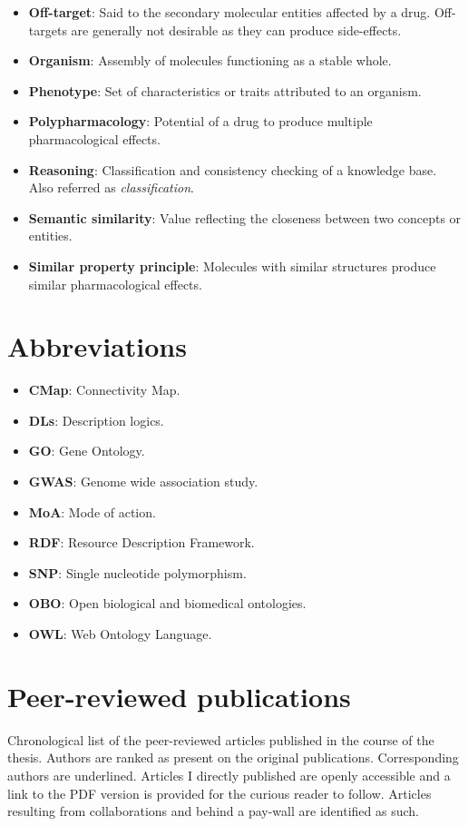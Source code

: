 \begin{itemize}
  \item \textbf{Off-target}: Said to the secondary molecular entities affected by a drug. Off-targets are generally not desirable as they can produce side-effects.
  \item \textbf{Organism}: Assembly of molecules functioning as a stable whole.
  \item \textbf{Phenotype}: Set of characteristics or traits attributed to an organism.
  \item \textbf{Polypharmacology}: Potential of a drug to produce multiple pharmacological effects.
  \item \textbf{Reasoning}: Classification and consistency checking of a knowledge base. Also referred as \emph{classification}.
  \item \textbf{Semantic similarity}: Value reflecting the closeness between two concepts or entities.
  \item \textbf{Similar property principle}: Molecules with similar structures produce similar pharmacological effects.
\end{itemize}

\chapter{Abbreviations}
\begin{itemize}
  \item \textbf{CMap}: Connectivity Map.
  \item \textbf{DLs}: Description logics.
  \item \textbf{GO}: Gene Ontology.
  \item \textbf{GWAS}: Genome wide association study.
  \item \textbf{MoA}: Mode of action.
  \item \textbf{RDF}: Resource Description Framework.
  \item \textbf{SNP}: Single nucleotide polymorphism.
  \item \textbf{OBO}: Open biological and biomedical ontologies.
  \item \textbf{OWL}: Web Ontology Language.
\end{itemize}

\chapter{Peer-reviewed publications}
Chronological list of the peer-reviewed articles published in the course of the thesis. Authors are ranked as present on the original publications. Corresponding authors are underlined. Articles I directly published are openly accessible and a link to the PDF version is provided for the curious reader to follow. Articles resulting from collaborations and behind a pay-wall are identified as such.

